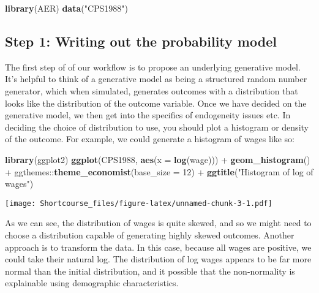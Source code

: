 \documentclass[]{book}
\newenvironment{Shaded}{\begin{snugshade}}{\end{snugshade}}
\newcommand{\KeywordTok}[1]{\textcolor[rgb]{0.13,0.29,0.53}{\textbf{{#1}}}}
\newcommand{\DataTypeTok}[1]{\textcolor[rgb]{0.13,0.29,0.53}{{#1}}}
\newcommand{\DecValTok}[1]{\textcolor[rgb]{0.00,0.00,0.81}{{#1}}}
\newcommand{\StringTok}[1]{\textcolor[rgb]{0.31,0.60,0.02}{{#1}}}
\newcommand{\NormalTok}[1]{{#1}}
\begin{document}
\begin{Shaded}
\begin{Highlighting}[]
\KeywordTok{library}\NormalTok{(AER)}
\KeywordTok{data}\NormalTok{(}\StringTok{"CPS1988"}\NormalTok{)}
\end{Highlighting}
\end{Shaded}

\subsection{Step 1: Writing out the probability
model}\label{step-1-writing-out-the-probability-model}

The first step of of our workflow is to propose an underlying generative
model. It's helpful to think of a generative model as being a structured
random number generator, which when simulated, generates outcomes with a
distribution that looks like the distribution of the outcome variable.
Once we have decided on the generative model, we then get into the
specifics of endogeneity issues etc. In deciding the choice of
distribution to use, you should plot a histogram or density of the
outcome. For example, we could generate a histogram of wages like so:

\begin{Shaded}
\begin{Highlighting}[]
\KeywordTok{library}\NormalTok{(ggplot2)}
\KeywordTok{ggplot}\NormalTok{(CPS1988, }\KeywordTok{aes}\NormalTok{(}\DataTypeTok{x =} \KeywordTok{log}\NormalTok{(wage))) +}
\StringTok{  }\KeywordTok{geom_histogram}\NormalTok{() +}\StringTok{ }
\StringTok{  }\NormalTok{ggthemes::}\KeywordTok{theme_economist}\NormalTok{(}\DataTypeTok{base_size =} \DecValTok{12}\NormalTok{) +}
\StringTok{  }\KeywordTok{ggtitle}\NormalTok{(}\StringTok{"Histogram of log of wages"}\NormalTok{)}
\end{Highlighting}
\end{Shaded}

\texttt{[image: Shortcourse\_files/figure-latex/unnamed-chunk-3-1.pdf]}

As we can see, the distribution of wages is quite skewed, and so we
might need to choose a distribution capable of generating highly skewed
outcomes. Another approach is to transform the data. In this case,
because all wages are positive, we could take their natural log. The
distribution of log wages appears to be far more normal than the initial
distribution, and it possible that the non-normality is explainable
using demographic characteristics.
\end{document}
